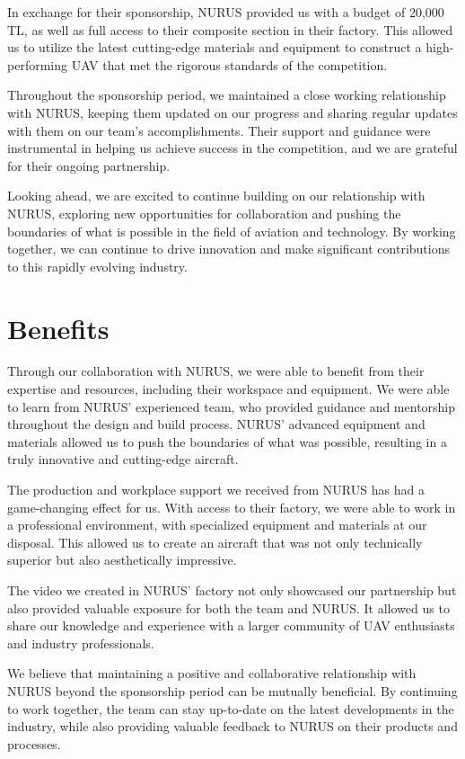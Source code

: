 \documentclass{article}
\begin{document}
In exchange for their sponsorship, NURUS provided us with a budget of 20,000 TL, as well as full access to their composite section in their factory. This allowed us to utilize the latest cutting-edge materials and equipment to construct a high-performing UAV that met the rigorous standards of the competition.

Throughout the sponsorship period, we maintained a close working relationship with NURUS, keeping them updated on our progress and sharing regular updates with them on our team's accomplishments. Their support and guidance were instrumental in helping us achieve success in the competition, and we are grateful for their ongoing partnership.

Looking ahead, we are excited to continue building on our relationship with NURUS, exploring new opportunities for collaboration and pushing the boundaries of what is possible in the field of aviation and technology. By working together, we can continue to drive innovation and make significant contributions to this rapidly evolving industry.


\section{Benefits}

Through our collaboration with NURUS, we were able to benefit from their expertise and resources, including their workspace and equipment. We were able to learn from NURUS' experienced team, who provided guidance and mentorship throughout the design and build process. NURUS' advanced equipment and materials allowed us to push the boundaries of what was possible, resulting in a truly innovative and cutting-edge aircraft.

The production and workplace support we received from NURUS has had a game-changing effect for us. With access to their factory, we were able to work in a professional environment, with specialized equipment and materials at our disposal. This allowed us to create an aircraft that was not only technically superior but also aesthetically impressive.

The video we created in NURUS' factory not only showcased our partnership but also provided valuable exposure for both the team and NURUS. It allowed us to share our knowledge and experience with a larger community of UAV enthusiasts and industry professionals.

We believe that maintaining a positive and collaborative relationship with NURUS beyond the sponsorship period can be mutually beneficial. By continuing to work together, the team can stay up-to-date on the latest developments in the industry, while also providing valuable feedback to NURUS on their products and processes.
\end{document}
